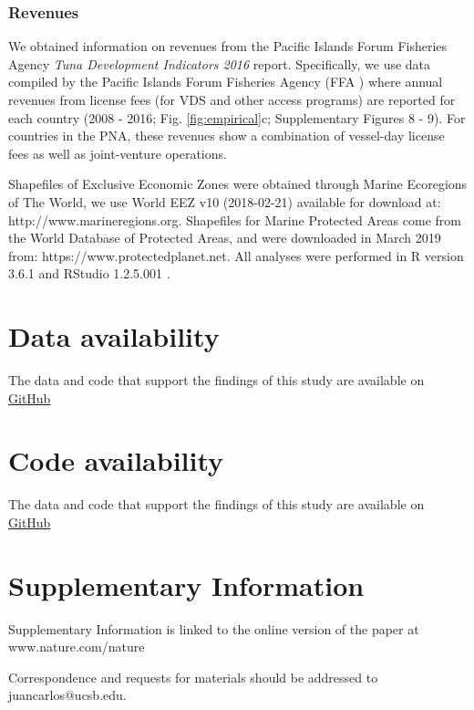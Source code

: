\documentclass[12pt]{article}
\begin{document}
\subsubsection{Revenues}

We obtained information on revenues from the Pacific Islands Forum Fisheries Agency \emph{Tuna Development Indicators 2016} report.  Specifically, we use data compiled by the Pacific Islands Forum Fisheries Agency (FFA \cite{ffa_2017}) where annual revenues from license fees (for VDS and other access programs) are reported for each country (2008 - 2016; Fig. \ref{fig:empirical}c; Supplementary Figures 8 - 9). For countries in the PNA, these revenues show a combination of vessel-day license fees as well as joint-venture operations.

Shapefiles of Exclusive Economic Zones were obtained through Marine Ecoregions of The World, we use World EEZ v10 (2018-02-21) available for download at: http://www.marineregions.org. Shapefiles for Marine Protected Areas come from the World Database of Protected Areas, and were downloaded in March 2019 from: https://www.protectedplanet.net. All analyses were performed in R version 3.6.1 and RStudio 1.2.5.001 \cite{rcore_2019}.

\section{Data availability}

The data and code that support the findings of this study are available on \href{https://github.com/jcvdav/MPA_displacement}{GitHub}

\section{Code availability}

The data and code that support the findings of this study are available on \href{https://github.com/jcvdav/MPA_displacement}{GitHub}




\section{Supplementary Information}

Supplementary Information is linked to the online version of the paper at www.nature.com/nature


Correspondence and requests for materials should be addressed to juancarlos@ucsb.edu.
\end{document}
